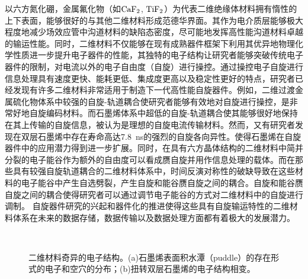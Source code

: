     以六方氮化硼，金属氟化物（如$\rm{CaF_{2}}$, $\rm{TiF_{2}}$）为代表二维绝缘体材料拥有惰性的上下表面，能够很好的与其他二维材料形成范德华界面。其作为电介质层能够极大程度地减少场效应管中沟道材料的缺陷态密度，尽可能地发挥高性能沟道材料卓越的输运性能。同时，二维材料不仅能够在现有成熟器件框架下利用其优异地物理化学性质进一步提升电子器件的性能，其独特的电子结构让研究者能够突破传统电子器件的限制，对电流以外的电子自由度（自旋）进行操控。通过操控电子自旋进行信息处理具有速度更快、能耗更低、集成度更高以及稳定性更好的特点，研究者已经发现有许多二维材料非常适用于制造下一代高性能自旋器件。例如，二维过渡金属硫化物体系中较强的自旋-轨道耦合使研究者能够有效地对自旋进行操控，是非常好地自旋编码材料。而石墨烯体系中超低的自旋-轨道耦合使其能够很好地保持在其上传输的自旋信息，被认为是理想的自旋电流传输材料。然而，又有研究者发现在双层石墨烯中存在寿命高达\SI{7.8}{\nano\second}的强烈的自旋各向异性。使得石墨烯在自旋器件中的应用潜力得到进一步扩展。同时，在具有六方晶体结构的二维材料中简并分裂的电子能谷作为额外的自由度可以看成赝自旋并用作信息处理的载体。而在那些具有较强自旋轨道耦合的二维材料体系中，时间反演对称性的破缺导致在这些材料的电子能谷中产生自选劈裂，产生自旋和能谷赝自旋之间的耦合。自旋和能谷赝自旋之间的耦合使得研究者可以通过调节电子能谷的方式对二维材料中的自旋进行调制。
    自旋器件研究的兴起和器件化的推进使得这些具有自旋输运特性的二维材料体系在未来的数据存储，数据传输以及数据处理方面都有着极大的发展潜力。

    \begin{figure}[htb]
        \\
        \caption{二维材料奇异的电子结构。(a)石墨烯表面积水潭（puddle）的存在形式的电子和空穴的分布；(b)扭转双层石墨烯的电子结构相变。}
    \end{figure}

